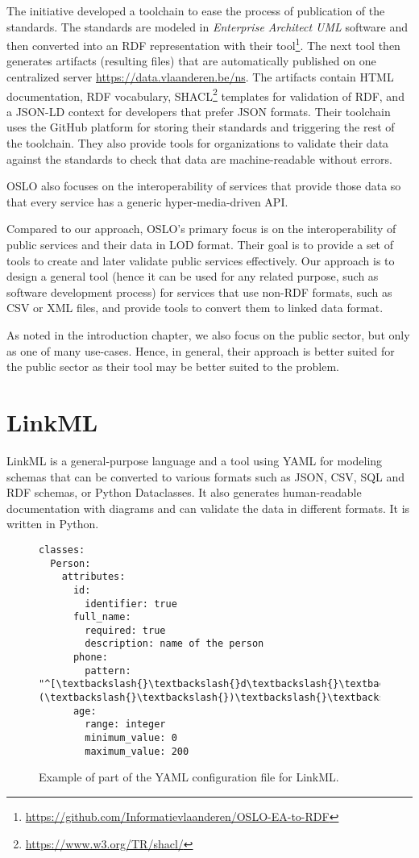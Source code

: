 The initiative developed a toolchain to ease the process of publication of the standards. The standards are modeled in \textit{Enterprise Architect UML} software and then converted into an RDF representation with their tool\footnote{\url{https://github.com/Informatievlaanderen/OSLO-EA-to-RDF}}. The next tool then generates artifacts (resulting files) that are automatically published on one centralized server \url{https://data.vlaanderen.be/ns}. The artifacts contain HTML documentation, RDF vocabulary, SHACL\footnote{\url{https://www.w3.org/TR/shacl/}} templates for validation of RDF, and a JSON-LD context for developers that prefer JSON formats. Their toolchain uses the GitHub platform for storing their standards and triggering the rest of the toolchain. They also provide tools for organizations to validate their data against the standards to check that data are machine-readable without errors.

OSLO also focuses on the interoperability of services that provide those data so that every service has a generic hyper-media-driven API.

\medskip

Compared to our approach, OSLO's primary focus is on the interoperability of public services and their data in LOD format. Their goal is to provide a set of tools to create and later validate public services effectively. Our approach is to design a general tool (hence it can be used for any related purpose, such as software development process) for services that use non-RDF formats, such as CSV or XML files, and provide tools to convert them to linked data format.

As noted in the introduction chapter, we also focus on the public sector, but only as one of many use-cases. Hence, in general, their approach is better suited for the public sector as their tool may be better suited to the problem.

\section{LinkML}

LinkML is a general-purpose language and a tool using YAML for modeling schemas that can be converted to various formats such as JSON, CSV, SQL and RDF schemas, or Python Dataclasses. It also generates human-readable documentation with diagrams and can validate the data in different formats. It is written in Python.

\begin{figure}[h!]\centering
    \begin{Verbatim}[commandchars=\\\{\}]
classes:
  Person:
    attributes:
      id:
        identifier: true
      full_name:
        required: true
        description: name of the person
      phone:
        pattern: "^[\textbackslash{}\textbackslash{}d\textbackslash{}\textbackslash{}(\textbackslash{}\textbackslash{})\textbackslash{}\textbackslash{}-]+$"
      age:
        range: integer
        minimum_value: 0
        maximum_value: 200
    \end{Verbatim}
    \caption{Example of part of the YAML configuration file for LinkML.}
\end{figure}

